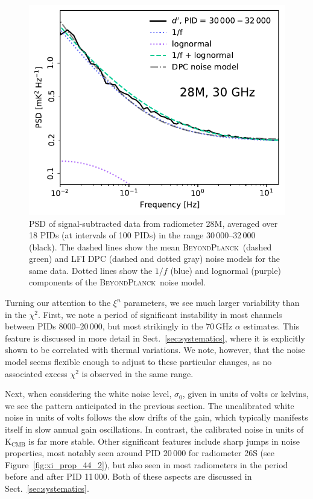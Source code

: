 \documentclass{aa}
\newcommand{\BP}{\textsc{BeyondPlanck}}
\begin{document}
\begin{figure}
        \begin{center}
                \includegraphics[width=\linewidth]{figs/ps_running_mean_28M_gaussian.pdf}
        \end{center}
        \caption{PSD of signal-subtracted data from radiometer 28M,
          averaged over 18 PIDs (at intervals of 100 PIDs) in the range 30\,000--32\,000
          (black). The dashed lines show the mean \BP\ (dashed green)
          and LFI DPC (dashed and dotted gray) noise models for the same data. Dotted lines show the $1/f$ (blue) and lognormal (purple) components of the \BP\ noise model. 
                \label{fig:ps_compare_28M}}
\end{figure}

Turning our attention to the $\xi^n$ parameters, we see much larger
variability than in the $\chi^2$. First, we note a period of
significant instability in most channels between PIDs 8000--20\,000, but
most strikingly in the 70\,GHz $\alpha$ estimates. This feature  is
discussed in more detail in Sect.~\ref{sec:systematics}, where it is
explicitly shown to be correlated with thermal variations. We note,
however, that the noise model seems flexible enough to adjust to
these particular changes, as no associated excess $\chi^2$ is observed
in the same range.

Next, when considering the white noise level, $\sigma_0$, given in
units of volts or kelvins, we see the pattern anticipated
in the previous section. The uncalibrated white noise in units of volts
follows the slow drifts of the gain, which typically manifests itself
in slow annual gain oscillations. In contrast, the calibrated noise in
units of $\mathrm{K}_{\mathrm{CMB}}$ is far more stable. Other significant features include sharp jumps in noise properties,
most notably seen around PID 20\,000 for radiometer 26S (see Figure~\ref{fig:xi_prop_44_2}), but also 
seen in most radiometers in the period before and after PID 11\,000. Both of these aspects are discussed in Sect.~\ref{sec:systematics}.
\end{document}
